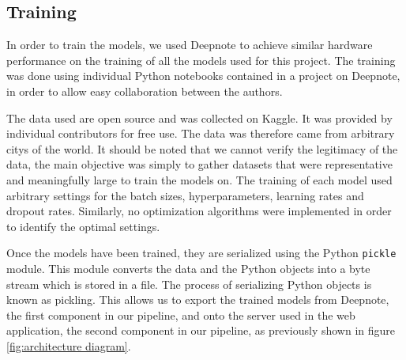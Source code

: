 \subsection{Training}
In order to train the models, we used Deepnote\cite{deepnote} to achieve similar hardware performance on the training of all the models used for this project. 
The training was done using individual Python notebooks contained in a project on Deepnote, in order to allow easy collaboration between the authors.

The data used are open source and was collected on Kaggle\cite{kaggle}. It was provided by individual contributors for free use.
The data was therefore came from arbitrary citys of the world. 
It should be noted that we cannot verify the legitimacy of the data, the main objective was simply to gather datasets that were representative and meaningfully large to train the models on. 
The training of each model used arbitrary settings for the batch sizes, hyperparameters, learning rates and dropout rates. Similarly, no optimization algorithms were implemented in order to identify the optimal settings. 

Once the models have been trained, they are serialized using the Python \texttt{pickle} module.
This module converts the data and the Python objects into a byte stream which is stored in a file.
The process of serializing Python objects is known as pickling. 
This allows us to export the trained models from Deepnote, the first component in our pipeline, and onto the server used in the web application, the second component in our pipeline, as previously shown in figure \ref{fig:architecture diagram}.\cite{pickle_documentation}